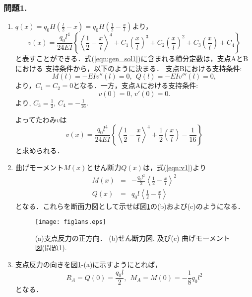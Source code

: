 \documentclass[10pt,a4j]{jarticle}
\begin{document}
\subsubsection*{問題1. }
\begin{enumerate}
\item
	$q(x)=q_0H\left(\frac{l}{2}-x\right)=q_0H\left(\frac{1}{2}-\frac{x}{l}\right)$より，
\begin{equation}
	v(x)=\frac{q_0l^4}{24EI}\left\{
			\left< \frac{1}{2} -\frac{x}{l} \right>^4
			+
			C_1\left(\frac{x}{l}\right)^3
			+
			C_2\left(\frac{x}{l}\right)^2
			+
			C_3\left(\frac{x}{l}\right)
			+
			C_4
		\right\}
		\label{eqn:gen_sol1}
\end{equation}
と表すことができる．式(\ref{eqn:gen_sol1})に含まれる積分定数は，支点AとBにおける
支持条件から，以下のように決まる．
支点Bにおける支持条件:
\begin{equation}
	M(l)=-EIv''(l) =0,
	\ \  
	Q(l)=-EIv'''(l) =0,
	\label{eqn:BC1_B}
\end{equation}
より，$C_1=C_2=0$となる．一方，支点Aにおける支持条件:
\begin{equation}
	v(0) =0, \, v'(0)=0.
	\label{eqn:BC1_A}
\end{equation}
より, $C_3=\frac{1}{2},\, C_4=-\frac{1}{16}$.

よってたわみ$v$は
\begin{equation}
	v(x)=\frac{q_0l^4}{24EI}\left\{
			\left< \frac{1}{2} -\frac{x}{l} \right>^4
			+
			\frac{1}{2}	
			\left(\frac{x}{l}\right)
			-
			\frac{1}{16}	
			\right\}
	\label{eqn:v1}
\end{equation}
と求められる．
\item
曲げモーメント$M(x)$とせん断力$Q(x)$は，式(\ref{eqn:v1})より
\begin{eqnarray}
	M(x) &=& 
		-\frac{q_0l^2}{2}
				\left< \frac{1}{2} -\frac{x}{l} \right>^2
	\label{eqn:M1}
	\\
	Q(x) &=&
		q_0l \left<\frac{1}{2} -\frac{x}{l}\right>
	\label{eqn:Q1}
\end{eqnarray}
となる．これらを断面力図として示せば図\ref{fig:fig1}の(b)および(c)のようになる．
\begin{figure}[h]
	\begin{center}
	\texttt{[image: fig1ans.eps]} 
	\end{center}
	\vspace{-5mm}
	\caption{(a)支点反力の正方向．
	(b)せん断力図, 及び(c) 曲げモーメント図(問題1).}
	\label{fig:fig1}
\end{figure}
\item
支点反力の向きを図\ref{fig:fig1}-(a)に示すようにとれば，
\begin{equation}
	R_A = Q(0) = \frac{q_0l}{2}, \ \ 
	M_A = M(0) = -\frac{1}{8}q_0l^2
\end{equation}
となる．
\end{enumerate}
\end{document}
